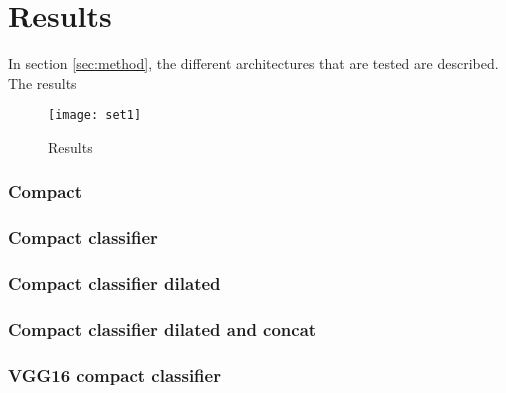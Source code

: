 \section{Results}\label{sec:results}

In section \ref{sec:method}, the different architectures that are tested are described. The results

\begin{figure}[h]
	\centering
	\texttt{[image: set1]}
	\caption{Results}
	\label{fig:results}
\end{figure}


\subsubsection{Compact}


\subsubsection{Compact classifier}


\subsubsection{Compact classifier dilated}


\subsubsection{Compact classifier dilated and concat}


\subsubsection{VGG16 compact classifier}
